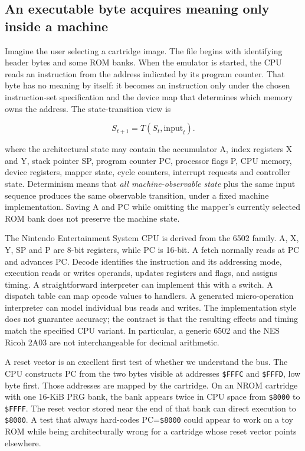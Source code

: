 \subsection{An executable byte acquires meaning only inside a machine}\label{an-executable-byte-acquires-meaning-only-inside-a-machine}

Imagine the user selecting a cartridge image. The file begins with identifying header bytes and some ROM banks. When the emulator is started, the CPU reads an instruction from the address indicated by its program counter. That byte has no meaning by itself: it becomes an instruction only under the chosen instruction-set specification and the device map that determines which memory owns the address. The state-transition view is

\[
S_{t+1}=T(S_t,\mathrm{input}_t).
\]

where the architectural state may contain the accumulator A, index registers X and Y, stack pointer SP, program counter PC, processor flags P, CPU memory, device registers, mapper state, cycle counters, interrupt requests and controller state. Determinism means that \emph{all machine-observable state} plus the same input sequence produces the same observable transition, under a fixed machine implementation. Saving A and PC while omitting the mapper's currently selected ROM bank does not preserve the machine state.

The Nintendo Entertainment System CPU is derived from the 6502 family. A, X, Y, SP and P are 8-bit registers, while PC is 16-bit. A fetch normally reads at PC and advances PC. Decode identifies the instruction and its addressing mode, execution reads or writes operands, updates registers and flags, and assigns timing. A straightforward interpreter can implement this with a switch. A dispatch table can map opcode values to handlers. A generated micro-operation interpreter can model individual bus reads and writes. The implementation style does not guarantee accuracy; the contract is that the resulting effects and timing match the specified CPU variant. In particular, a generic 6502 and the NES Ricoh 2A03 are not interchangeable for decimal arithmetic.

A reset vector is an excellent first test of whether we understand the bus. The CPU constructs PC from the two bytes visible at addresses \texttt{\$FFFC} and \texttt{\$FFFD}, low byte first. Those addresses are mapped by the cartridge. On an NROM cartridge with one 16-KiB PRG bank, the bank appears twice in CPU space from \texttt{\$8000} to \texttt{\$FFFF}. The reset vector stored near the end of that bank can direct execution to \texttt{\$8000}. A test that always hard-codes PC=\texttt{\$8000} could appear to work on a toy ROM while being architecturally wrong for a cartridge whose reset vector points elsewhere.

